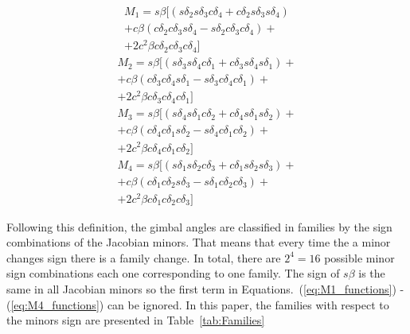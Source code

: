 \documentclass[aerospace,article,submit,moreauthors,dvi2pdf]{Definitions/mdpi}
\begin{document}
\begin{equation}
\begin{matrix}
M_{1}=s \beta[( s \delta_{2} s \delta_{3} c \delta_{4}+c \delta_{2} s \delta_{3} s \delta_{4}) \\
+c \beta(c \delta_{2} c \delta_{3} s \delta_{4}-s \delta_{2} c \delta_{3} c \delta_{4}) +\\
+2 c ^{2} \beta c \delta_{2} c \delta_{3} c \delta_{4}]
\end{matrix}
\label{eq:M1_functions}
\end{equation}
\begin{equation}
\begin{matrix}
M_{2}= s \beta[(s \delta_{3} s \delta_{4} c \delta_{1}+c \delta_{3} s \delta_{4} s \delta_{1})+\\
+c \beta (c \delta_{3} c \delta_{4} s \delta_{1}-s \delta_{3} c \delta_{4} c \delta_{1}) +\\
+2 c ^{2} \beta c \delta_{3} c \delta_{4} c \delta_{1}]
\end{matrix}
\label{eq:M2_functions}
\end{equation}
\begin{equation}
\begin{matrix}
M_{3}=s \beta[(s \delta_{4} s \delta_{1} c \delta_{2}+c \delta_{4} s \delta_{1} s \delta_{2})+\\
+c \beta(c \delta_{4} c \delta_{1} s \delta_{2}-s \delta_{4} c \delta_{1} c \delta_{2}) +\\
+2 c ^{2} \beta c \delta_{4} c \delta_{1} c \delta_{2}]
\end{matrix}
\label{eq:M3_functions}
\end{equation}
\begin{equation}
\begin{matrix}
M_{4}= s \beta[(s \delta_{1} s \delta_{2} c \delta_{3}+c \delta_{1} s \delta_{2} s \delta_{3})+\\
+c \beta(c \delta_{1} c \delta_{2} s \delta_{3}-s \delta_{1} c \delta_{2} c \delta_{3})+ \\
+2 c ^{2} \beta c \delta_{1} c \delta_{2} c \delta_{3}]
\end{matrix}
\label{eq:M4_functions}
\end{equation}

Following this definition, the gimbal angles are classified in families by the sign combinations of the Jacobian minors. That means that every time the a minor changes sign there is a family change. In total, there are $2^4=16$ possible minor sign combinations each one corresponding to one family. The sign of $s\beta$ is the same in all Jacobian minors so the first term in Equations.~(\ref{eq:M1_functions}) - (\ref{eq:M4_functions}) can be ignored. In this paper, the families with respect to the minors sign are presented in Table~\ref{tab:Families}
\end{document}
